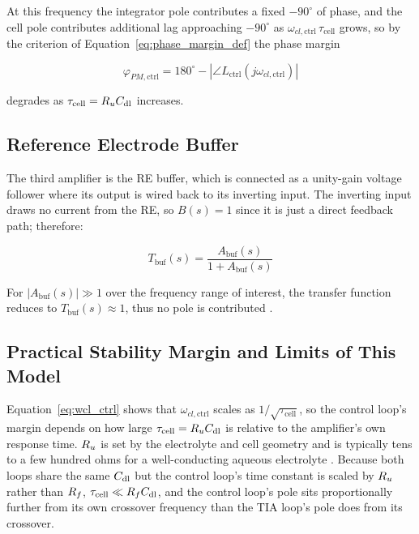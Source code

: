 At this frequency the integrator pole contributes a fixed $-90^\circ$ of phase, and the cell pole contributes additional lag approaching $-90^\circ$ as $\omega_{cl,\text{ctrl}}\,\tau_{\text{cell}}$ grows, so by the criterion of Equation~\eqref{eq:phase_margin_def} the phase margin
 
\begin{equation}
\varphi_{PM,\text{ctrl}} = 180^\circ - |\angle L_{\text{ctrl}}(j\omega_{cl,\text{ctrl}})|
\label{eq:pm_ctrl}
\end{equation}
 
degrades as $\tau_{\text{cell}} = R_{u}C_{\mathrm{dl}}$ increases.
 
\subsection{Reference Electrode Buffer}
\label{sec:re-buffer}
 
The third amplifier is the RE buffer, which is connected as a unity-gain voltage follower where its output is wired back to its inverting input. The inverting input draws no current from the RE, so $B(s) = 1$ since it is just a direct feedback path; therefore:
 
\begin{equation}
T_{\text{buf}}(s) = \frac{A_{\text{buf}}(s)}{1+A_{\text{buf}}(s)}
\label{eq:tbuf}
\end{equation}
 
For $|A_{\text{buf}}(s)| \gg 1$ over the frequency range of interest, the transfer function reduces to $T_{\text{buf}}(s) \approx 1$, thus no pole is contributed \cite{c3}.
 
\subsection{Practical Stability Margin and Limits of This Model}
\label{sec:practical-limits}
 
Equation~\eqref{eq:wcl_ctrl} shows that $\omega_{cl,\text{ctrl}}$ scales as $1/\sqrt{\tau_{\text{cell}}}$, so the control loop's margin depends on how large $\tau_{\text{cell}} = R_{u}C_{\mathrm{dl}}$ is relative to the amplifier's own response time. $R_{u}$ is set by the electrolyte and cell geometry and is typically tens to a few hundred ohms for a well-conducting aqueous electrolyte \cite{bard2001}. Because both loops share the same $C_{\mathrm{dl}}$ but the control loop's time constant is scaled by $R_{u}$ rather than $R_{f}$, $\tau_{\text{cell}} \ll R_{f}C_{\mathrm{dl}}$, and the control loop's pole sits proportionally further from its own crossover frequency than the TIA loop's pole does from its crossover.
 
